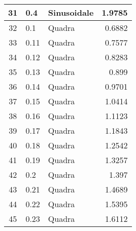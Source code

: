 \documentclass[a4paper]{article}
\begin{document}
\begin{center}
\begin{tabular}{|c|llr|}
			31	&	0.4	&	Sinusoidale	&	1.9785	\\
			\midrule
			32	&	0.1	&	Quadra	&	0.6882	\\
			33	&	0.11	&	Quadra	&	0.7577	\\
			34	&	0.12	&	Quadra	&	0.8283	\\
			35	&	0.13	&	Quadra	&	0.899	\\
			36	&	0.14	&	Quadra	&	0.9701	\\
			37	&	0.15	&	Quadra	&	1.0414	\\
			38	&	0.16	&	Quadra	&	1.1123	\\
			39	&	0.17	&	Quadra	&	1.1843	\\
			40	&	0.18	&	Quadra	&	1.2542	\\
			41	&	0.19	&	Quadra	&	1.3257	\\
			42	&	0.2	&	Quadra	&	1.397	\\
			43	&	0.21	&	Quadra	&	1.4689	\\
			44	&	0.22	&	Quadra	&	1.5395	\\
			45	&	0.23	&	Quadra	&	1.6112	\\
			
		\end{tabular}
	\end{center}	
	
\end{document}
